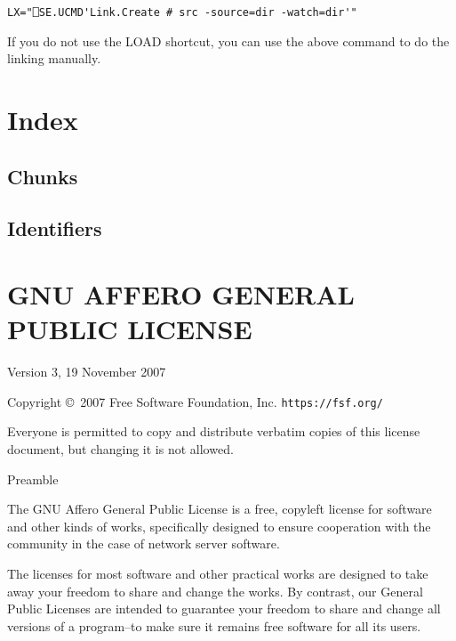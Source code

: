 \documentclass{article}%
\begin{document}
\begin{verbatim}
LX="⎕SE.UCMD'Link.Create # src -source=dir -watch=dir'"
\end{verbatim}

If you do not use the {\Tt{}LOAD\nwendquote} shortcut, you can use the above
command to do the linking manually.

\section{Index}

\subsection{Chunks}

\nowebchunks

\subsection{Identifiers}

\nowebindex

\clearpage
\section{GNU AFFERO GENERAL PUBLIC LICENSE}

\begin{center}
{\parindent 0in

Version 3, 19 November 2007

Copyright \copyright\    2007 Free Software Foundation, Inc. \texttt{https://fsf.org/}

\bigskip
Everyone is permitted to copy and distribute verbatim copies of this
license document, but changing it is not allowed.}

\end{center}

\begin{center}
{\Large \sc Preamble}
\end{center}

The GNU Affero General Public License is a free, copyleft license
for software and other kinds of works, specifically designed to ensure
cooperation with the community in the case of network server software.

The licenses for most software and other practical works are
designed to take away your freedom to share and change the works.        By
contrast, our General Public Licenses are intended to guarantee your
freedom to share and change all versions of a program--to make sure it
remains free software for all its users.
\end{document}
